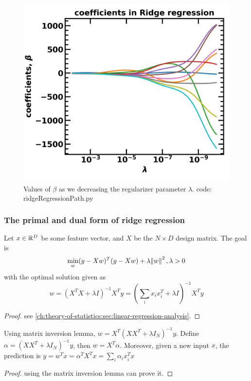 \begin{refsection}
\begin{figure}[H]
	\centering
	\includegraphics[width=0.6\linewidth]{../figures/statisticalLearning/linearModelRegression/ridgeCoefficientPath}
	\caption{Values of $\beta$ as we decreasing the regularizer parameter $\lambda$. code: ridgeRegressionPath.py}
	\label{fig:ridgeCoefficientPath}
\end{figure}


\subsubsection{The primal and dual form of ridge regression}

\begin{lemma}
	\cite[494]{murphy2012machine}Let $x\in \mathbb{R}^D$ be some feature vector, and $X$ be the $N\times D$ design matrix. The goal is
	$$\min_{w} (y - Xw)^T(y - Xw) + \lambda \norm{w}^2,\lambda > 0$$
	with the optimal solution given as
	$$w = (X^TX + \lambda I)^{-1} X^Ty = (\sum_i x_ix_i^T + \lambda I)^{-1} X^Ty$$
\end{lemma}
\begin{proof}
	see \autoref{ch:theory-of-statistics:sec:linear-regression-analysis}.	
\end{proof}


\begin{lemma}
	\cite[494]{murphy2012machine}
	Using matrix inversion lemma, $w = X^T(XX^T + \lambda I_N)^{-1}y$. Define $\alpha = (XX^T + \lambda I_N)^{-1}y$, then $w = X^T\alpha$. Moreover, given a new input $x$, 
	the prediction is $y = w^T x = \alpha^T X^T x = \sum_{i} \alpha_i x^T_i x$
\end{lemma}
\begin{proof}
	using the matrix inversion lemma can prove it.	
\end{proof}



\end{refsection}
